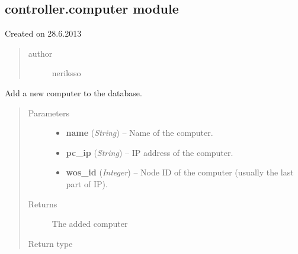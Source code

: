 \documentclass[letterpaper,10pt,english]{sphinxmanual}
\begin{document}
\subsection{controller.computer module}
\label{controller:module-controller.computer}\label{controller:controller-computer-module}
Created on 28.6.2013
\begin{quote}\begin{description}
\item[{author}] \leavevmode
neriksso

\end{description}\end{quote}

\begin{fulllineitems}
\label{controller:controller.computer.add_computer}
Add a new computer to the database.
\begin{quote}\begin{description}
\item[{Parameters}] \leavevmode\begin{itemize}
\item {} 
\textbf{name} (\emph{String}) -- Name of the computer.

\item {} 
\textbf{pc\_ip} (\emph{String}) -- IP address of the computer.

\item {} 
\textbf{wos\_id} (\emph{Integer}) -- Node ID of the computer (usually the last part of IP).

\end{itemize}

\item[{Returns}] \leavevmode
The added computer

\item[{Return type}] \leavevmode
{\hyperref[models:models.Computer]{}}

\end{description}\end{quote}

\end{fulllineitems}

\end{document}
